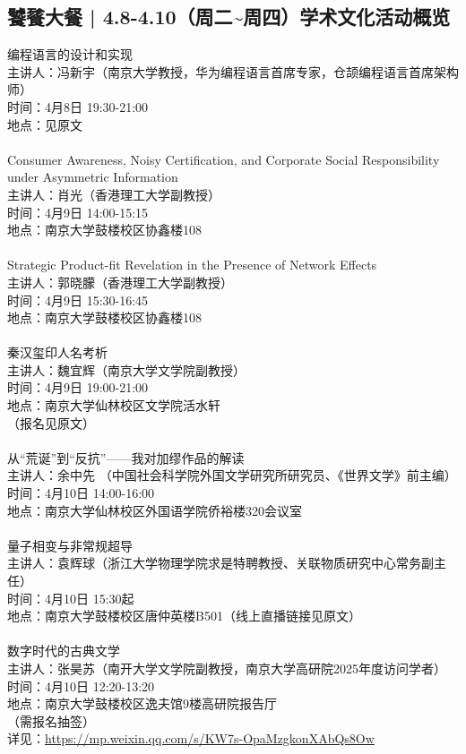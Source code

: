 \documentclass[letterpaper, 12pt]{article}
\begin{document}
\begin{multicols}{2}
\subsection{饕餮大餐 | 4.8-4.10（周二\textasciitilde{}周四）学术文化活动概览}
编程语言的设计和实现
\\主讲人：冯新宇（南京大学教授，华为编程语言首席专家，仓颉编程语言首席架构师）
\\时间：4月8日 19:30-21:00
\\地点：见原文
\\
\\Consumer Awareness, Noisy Certification, and Corporate Social Responsibility under Asymmetric Information
\\主讲人：肖光（香港理工大学副教授）
\\时间：4月9日 14:00-15:15
\\地点：南京大学鼓楼校区协鑫楼108
\\
\\Strategic Product-fit Revelation in the Presence of Network Effects
\\主讲人：郭晓朦（香港理工大学副教授）
\\时间：4月9日 15:30-16:45
\\地点：南京大学鼓楼校区协鑫楼108
\\
\\秦汉玺印人名考析
\\主讲人：魏宜辉（南京大学文学院副教授）
\\时间：4月9日 19:00-21:00
\\地点：南京大学仙林校区文学院活水轩
\\（报名见原文）
\\
\\从“荒诞”到“反抗”——我对加缪作品的解读
\\主讲人：余中先 （中国社会科学院外国文学研究所研究员、《世界文学》前主编）
\\时间：4月10日 14:00-16:00
\\地点：南京大学仙林校区外国语学院侨裕楼320会议室
\\
\\量子相变与非常规超导
\\主讲人：袁辉球（浙江大学物理学院求是特聘教授、关联物质研究中心常务副主任）
\\时间：4月10日 15:30起
\\地点：南京大学鼓楼校区唐仲英楼B501（线上直播链接见原文）
\\
\\数字时代的古典文学
\\主讲人：张昊苏（南开大学文学院副教授，南京大学高研院2025年度访问学者）
\\时间：4月10日 12:20-13:20
\\地点：南京大学鼓楼校区逸夫馆9楼高研院报告厅
\\（需报名抽签）
\\详见：\url{https://mp.weixin.qq.com/s/KW7s-OpaMzgkonXAbQs8Ow}



\end{multicols}
\end{document}
